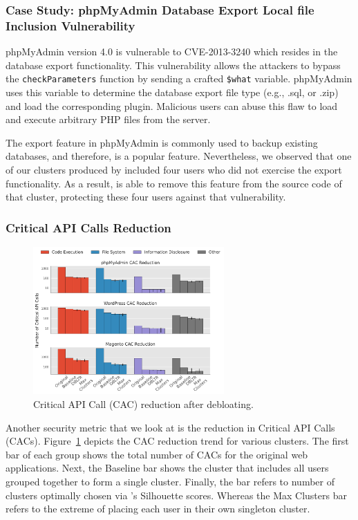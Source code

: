 \subsubsection{Case Study: phpMyAdmin Database Export Local file Inclusion Vulnerability}

phpMyAdmin version 4.0 is vulnerable to CVE-2013-3240 which resides in the database export functionality. 
This vulnerability allows the attackers to bypass the \texttt{checkParameters} function by sending a crafted \texttt{\$what} variable. 
phpMyAdmin uses this variable to determine the database export file type (e.g., .sql, or .zip) and load the corresponding plugin. 
Malicious users can abuse this flaw to load and execute arbitrary PHP files from the server. 

The export feature in phpMyAdmin is commonly used to backup existing databases, and therefore, is a popular feature. 
Nevertheless, we observed that one of our clusters produced by \sys{} included four users who did not exercise the export functionality. As a result, \sys{} is able to remove this feature from the source code of that cluster, protecting these four users against that vulnerability. 

\subsubsection{Critical API Calls Reduction}

\begin{figure}[t]
    \centering
    \includegraphics[width=0.65\textwidth]{figures/dbltr/cac_reduction.pdf}
    \caption{Critical API Call (CAC) reduction after debloating.}
    \label{fig:cac_reduction}
\end{figure}

Another security metric that we look at is the reduction in Critical API Calls (CACs). 
Figure~\ref{fig:cac_reduction} depicts the CAC reduction trend for various clusters. 
The first bar of each group shows the total number of CACs for the original web applications.
Next, the Baseline bar shows the cluster that includes all users grouped together to form a single cluster. 
Finally, the \sys{} bar refers to number of clusters optimally chosen via \sys{}'s Silhouette scores. 
Whereas the Max Clusters bar refers to the extreme of placing each user in their own singleton cluster.

